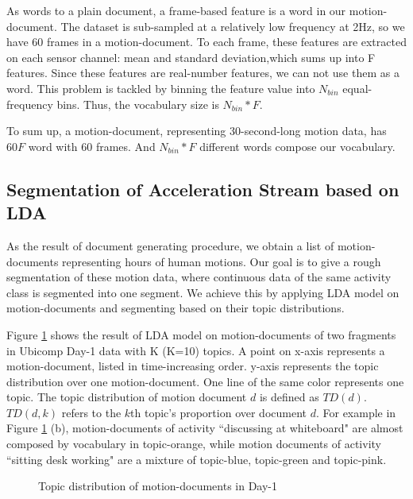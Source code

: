 \documentclass{sigchi}
\begin{document}
    As words to a plain document, a frame-based feature is a word in our motion-document.
    The dataset is sub-sampled at a relatively low frequency at 2Hz, so we have 60 frames in a motion-document.
    To each frame, these features are extracted on each sensor channel: mean and standard deviation,which sums up into F features.
    Since these features are real-number features, we can not use them as a word. This problem is tackled by binning the feature value into $N_{bin}$ equal-frequency bins.
    Thus, the vocabulary size is $N_{bin} * F$.

    To sum up, a motion-document, representing 30-second-long motion data, has $60F$ word with 60 frames. And $N_{bin} * F$ different words compose our vocabulary.

    \subsection{Segmentation of Acceleration Stream based on LDA}

    As the result of document generating procedure, we obtain a list of motion-documents representing hours of human motions.
    Our goal is to give a rough segmentation of these motion data, where continuous data of the same activity class is segmented into one segment.
    We achieve this by applying LDA model on motion-documents and segmenting based on their topic distributions.

    Figure \ref{fig: day1-tm_sample} shows the result of LDA model on motion-documents of two fragments in Ubicomp Day-1 data with K (K=10) topics.
    A point on x-axis represents a motion-document, listed in time-increasing order.
    y-axis represents the topic distribution over one motion-document. One line of the same color represents one topic.
    The topic distribution of motion document $d$ is defined as $TD(d)$. $TD(d, k)$ refers to the $k$th topic's proportion over document $d$.
    For example in Figure \ref{fig: day1-tm_sample} (b), motion-documents of activity ``discussing at whiteboard" are almost composed by vocabulary in topic-orange, while motion documents of activity ``sitting desk working" are a mixture of topic-blue, topic-green and topic-pink.

     \begin{figure}
         \centering
         \vspace{0.1cm}
        \caption{Topic distribution of motion-documents in Day-1}
        \label{fig: day1-tm_sample}
    \end{figure}
\end{document}
